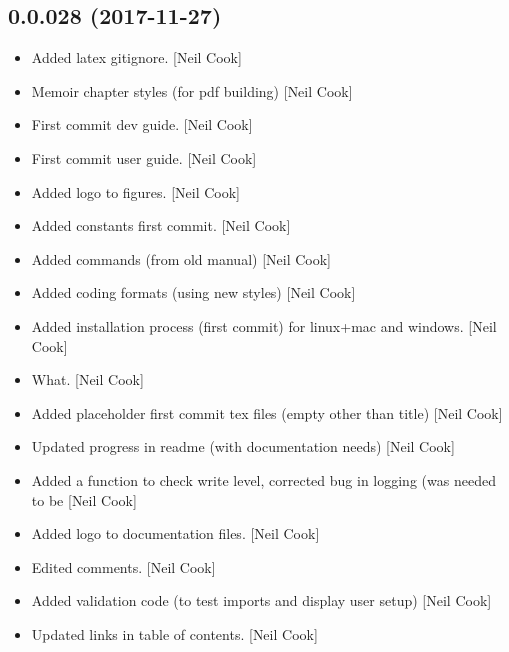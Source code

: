 \documentclass[a4paper,10pt,english]{report}
\begin{document}
\subsection{0.0.028 (2017-11-27)}
\label{\detokenize{misc/changelog:id524}}\begin{itemize}
\item {} 
Added latex gitignore. {[}Neil Cook{]}

\item {} 
Memoir chapter styles (for pdf building) {[}Neil Cook{]}

\item {} 
First commit dev guide. {[}Neil Cook{]}

\item {} 
First commit user guide. {[}Neil Cook{]}

\item {} 
Added logo to figures. {[}Neil Cook{]}

\item {} 
Added constants first commit. {[}Neil Cook{]}

\item {} 
Added commands (from old manual) {[}Neil Cook{]}

\item {} 
Added coding formats (using new styles) {[}Neil Cook{]}

\item {} 
Added installation process (first commit) for linux+mac and windows.
{[}Neil Cook{]}

\item {} 
What. {[}Neil Cook{]}

\item {} 
Added placeholder first commit tex files (empty other than title)
{[}Neil Cook{]}

\item {} 
Updated progress in readme (with documentation needs) {[}Neil Cook{]}

\item {} 
Added a function to check write level, corrected bug in logging (was
 needed to be  {[}Neil Cook{]}

\item {} 
Added logo to documentation files. {[}Neil Cook{]}

\item {} 
Edited comments. {[}Neil Cook{]}

\item {} 
Added validation code (to test imports and display user setup) {[}Neil
Cook{]}

\item {} 
Updated links in table of contents. {[}Neil Cook{]}

\end{itemize}
\end{document}
